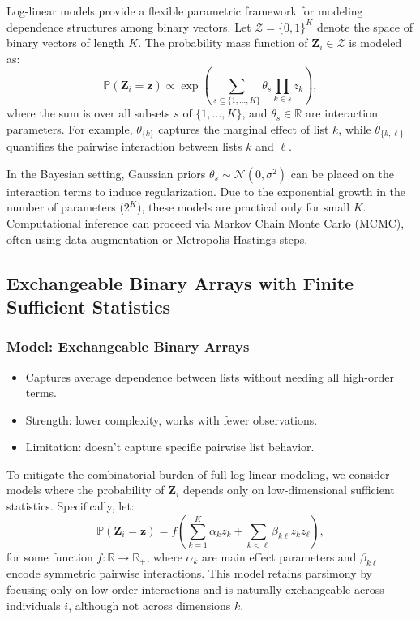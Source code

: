 \documentclass[
  12pt,
]{article}
\providecommand{\tightlist}{%
  \setlength{\itemsep}{0pt}\setlength{\parskip}{0pt}}\usepackage{longtable,booktabs,array}
\theoremstyle{plain}
\theoremstyle{definition}
\begin{document}
Log-linear models provide a flexible parametric framework for modeling
dependence structures among binary vectors. Let
\(\mathcal{Z} = \{0,1\}^K\) denote the space of binary vectors of length
\(K\). The probability mass function of \(\mathbf{Z}_i \in \mathcal{Z}\)
is modeled as: \[
\mathbb{P}(\mathbf{Z}_i = \mathbf{z}) \propto \exp\left( \sum_{s \subseteq \{1, \ldots, K\}} \theta_s \prod_{k \in s} z_k \right),
\] where the sum is over all subsets \(s\) of \(\{1, \ldots, K\}\), and
\(\theta_s \in \mathbb{R}\) are interaction parameters. For example,
\(\theta_{\{k\}}\) captures the marginal effect of list \(k\), while
\(\theta_{\{k,\ell\}}\) quantifies the pairwise interaction between
lists \(k\) and \(\ell\).

In the Bayesian setting, Gaussian priors
\(\theta_s \sim \mathcal{N}(0, \sigma^2)\) can be placed on the
interaction terms to induce regularization. Due to the exponential
growth in the number of parameters (\(2^K\)), these models are practical
only for small \(K\). Computational inference can proceed via Markov
Chain Monte Carlo (MCMC), often using data augmentation or
Metropolis-Hastings steps.

\subsection{Exchangeable Binary Arrays with Finite Sufficient
Statistics}\label{exchangeable-binary-arrays-with-finite-sufficient-statistics}

\subsubsection{Model: Exchangeable Binary
Arrays}\label{model-exchangeable-binary-arrays}

\begin{itemize}
\tightlist
\item
  Captures average dependence between lists without needing all
  high-order terms.
\item
  Strength: lower complexity, works with fewer observations.
\item
  Limitation: doesn't capture specific pairwise list behavior.
\end{itemize}

To mitigate the combinatorial burden of full log-linear modeling, we
consider models where the probability of \(\mathbf{Z}_i\) depends only
on low-dimensional sufficient statistics. Specifically, let: \[
\mathbb{P}(\mathbf{Z}_i = \mathbf{z}) = f\left( \sum_{k=1}^K \alpha_k z_k + \sum_{k<\ell} \beta_{k\ell} z_k z_\ell \right),
\] for some function \(f: \mathbb{R} \rightarrow \mathbb{R}_+\), where
\(\alpha_k\) are main effect parameters and \(\beta_{k\ell}\) encode
symmetric pairwise interactions. This model retains parsimony by
focusing only on low-order interactions and is naturally exchangeable
across individuals \(i\), although not across dimensions \(k\).
\end{document}
